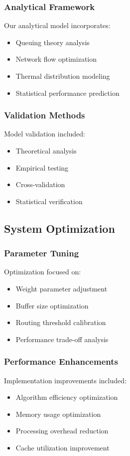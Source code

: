 \documentclass[12pt]{article}
\begin{document}
\subsubsection{Analytical Framework}
Our analytical model incorporates:
\begin{itemize}[noitemsep]
    \item Queuing theory analysis
    \item Network flow optimization
    \item Thermal distribution modeling
    \item Statistical performance prediction
\end{itemize}

\subsubsection{Validation Methods}
Model validation included:
\begin{itemize}[noitemsep]
    \item Theoretical analysis
    \item Empirical testing
    \item Cross-validation
    \item Statistical verification
\end{itemize}

\subsection{System Optimization}
\subsubsection{Parameter Tuning}
Optimization focused on:
\begin{itemize}[noitemsep]
    \item Weight parameter adjustment
    \item Buffer size optimization
    \item Routing threshold calibration
    \item Performance trade-off analysis
\end{itemize}

\subsubsection{Performance Enhancements}
Implementation improvements included:
\begin{itemize}[noitemsep]
    \item Algorithm efficiency optimization
    \item Memory usage optimization
    \item Processing overhead reduction
    \item Cache utilization improvement
\end{itemize}
\end{document}
